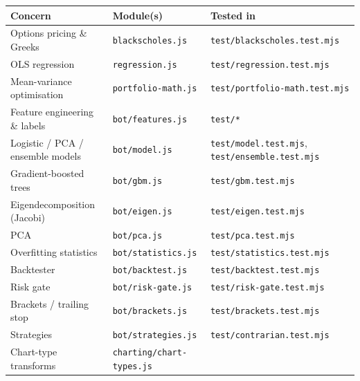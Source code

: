 \documentclass[
  11pt,
]{article}
\newcounter{none} %
\begin{document}
{\def\LTcaptype{none} %
\begin{longtable}[]{@{}
  >{\raggedright\arraybackslash}p{}
  >{\raggedright\arraybackslash}p{}
  >{\raggedright\arraybackslash}p{}@{}}
\toprule\noalign{}
\begin{minipage}[b]{\linewidth}\raggedright
Concern
\end{minipage} & \begin{minipage}[b]{\linewidth}\raggedright
Module(s)
\end{minipage} & \begin{minipage}[b]{\linewidth}\raggedright
Tested in
\end{minipage} \\
\midrule\noalign{}
\endhead
\bottomrule\noalign{}
\endlastfoot
Options pricing \& Greeks & \texttt{blackscholes.js} &
\texttt{test/blackscholes.test.mjs} \\
OLS regression & \texttt{regression.js} &
\texttt{test/regression.test.mjs} \\
Mean-variance optimisation & \texttt{portfolio-math.js} &
\texttt{test/portfolio-math.test.mjs} \\
Feature engineering \& labels & \texttt{bot/features.js} &
\texttt{test/*} \\
Logistic / PCA / ensemble models & \texttt{bot/model.js} &
\texttt{test/model.test.mjs}, \texttt{test/ensemble.test.mjs} \\
Gradient-boosted trees & \texttt{bot/gbm.js} &
\texttt{test/gbm.test.mjs} \\
Eigendecomposition (Jacobi) & \texttt{bot/eigen.js} &
\texttt{test/eigen.test.mjs} \\
PCA & \texttt{bot/pca.js} & \texttt{test/pca.test.mjs} \\
Overfitting statistics & \texttt{bot/statistics.js} &
\texttt{test/statistics.test.mjs} \\
Backtester & \texttt{bot/backtest.js} &
\texttt{test/backtest.test.mjs} \\
Risk gate & \texttt{bot/risk-gate.js} &
\texttt{test/risk-gate.test.mjs} \\
Brackets / trailing stop & \texttt{bot/brackets.js} &
\texttt{test/brackets.test.mjs} \\
Strategies & \texttt{bot/strategies.js} &
\texttt{test/contrarian.test.mjs} \\
Chart-type transforms & \texttt{charting/chart-types.js} &

\end{longtable}}
\end{document}
